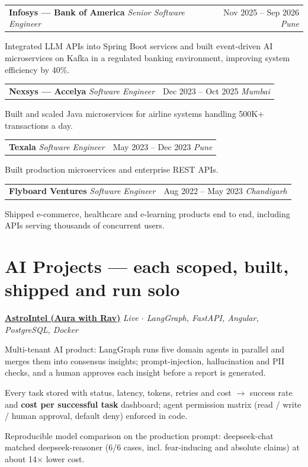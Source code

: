 \documentclass[10pt, letterpaper]{article}
\makeatletter
\newcommand{\resumeitem}[1]{\item\small{#1}}
\newcommand{\jobheading}[4]{%
  \noindent
  \begin{tabularx}{\textwidth}{@{}X r@{}}
    \textbf{\color{primary}#1} \textbar{} \textit{\small\color{subtle}#2} &
    \small\color{subtle}#3 \textbar{} \textit{\small #4}
  \end{tabularx}%
}
\makeatother
\begin{document}
\jobheading{Infosys --- Bank of America}{Senior Software Engineer}{Nov 2025 -- Sep 2026}{Pune}

\begin{jobitems}
\resumeitem{Integrated LLM APIs into Spring Boot services and built event-driven AI microservices on Kafka in a regulated banking environment, improving system efficiency by 40\%.}
\end{jobitems}

\jobheading{Nexsys --- Accelya}{Software Engineer}{Dec 2023 -- Oct 2025}{Mumbai}

\begin{jobitems}
\resumeitem{Built and scaled Java microservices for airline systems handling 500K+ transactions a day.}
\end{jobitems}

\jobheading{Texala}{Software Engineer}{May 2023 -- Dec 2023}{Pune}

\begin{jobitems}
\resumeitem{Built production microservices and enterprise REST APIs.}
\end{jobitems}

\jobheading{Flyboard Ventures}{Software Engineer}{Aug 2022 -- May 2023}{Chandigarh}

\begin{jobitems}
\resumeitem{Shipped e-commerce, healthcare and e-learning products end to end, including APIs serving thousands of concurrent users.}
\end{jobitems}

\section{AI Projects \textnormal{\small\color{subtle}--- each scoped, built, shipped and run solo}}

\noindent\href{https://aurawithrav.com}{\textbf{AstroIntel (Aura with Rav)}} \hfill \textit{\small\color{subtle}Live $\cdot$ LangGraph, FastAPI, Angular, PostgreSQL, Docker}

\begin{projectitems}
\resumeitem{Multi-tenant AI product: LangGraph runs five domain agents in parallel and merges them into consensus insights; prompt-injection, hallucination and PII checks, and a human approves each insight before a report is generated.}
\resumeitem{Every task stored with status, latency, tokens, retries and cost $\rightarrow$ success rate and \textbf{cost per successful task} dashboard; agent permission matrix (read / write / human approval, default deny) enforced in code.}
\resumeitem{Reproducible model comparison on the production prompt: deepseek-chat matched deepseek-reasoner (6/6 cases, incl. fear-inducing and absolute claims) at about 14$\times$ lower cost.}
\end{projectitems}
\end{document}
